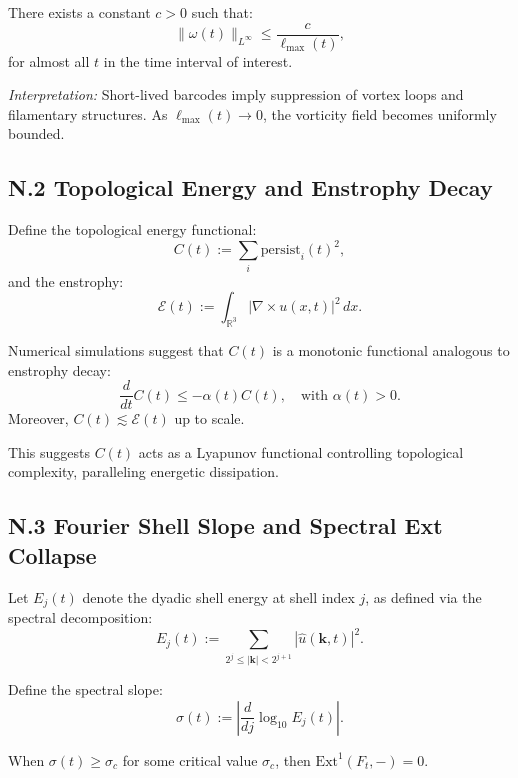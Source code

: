 \documentclass[11pt]{article}
\theoremstyle{definition}
\begin{document}
\begin{conjecture}
There exists a constant \( c > 0 \) such that:
\[
\|\omega(t)\|_{L^\infty} \leq \frac{c}{\ell_{\max}(t)},
\]
for almost all \( t \) in the time interval of interest.
\end{conjecture}

\textit{Interpretation:} Short-lived barcodes imply suppression of vortex loops and filamentary structures. As \( \ell_{\max}(t) \to 0 \), the vorticity field becomes uniformly bounded.

\subsection*{N.2 Topological Energy and Enstrophy Decay}

Define the topological energy functional:
\[
C(t) := \sum_i \mathrm{persist}_i(t)^2,
\]
and the enstrophy:
\[
\mathcal{E}(t) := \int_{\mathbb{R}^3} |\nabla \times u(x,t)|^2 \, dx.
\]

\begin{observation}
Numerical simulations suggest that \( C(t) \) is a monotonic functional analogous to enstrophy decay:
\[
\frac{d}{dt} C(t) \leq -\alpha(t) C(t), \quad \text{with } \alpha(t) > 0.
\]
Moreover, \( C(t) \lesssim \mathcal{E}(t) \) up to scale.
\end{observation}

This suggests \( C(t) \) acts as a Lyapunov functional controlling topological complexity, paralleling energetic dissipation.

\subsection*{N.3 Fourier Shell Slope and Spectral Ext Collapse}

Let \( E_j(t) \) denote the dyadic shell energy at shell index \( j \), as defined via the spectral decomposition:
\[
E_j(t) := \sum_{2^j \leq |\mathbf{k}| < 2^{j+1}} |\hat{u}(\mathbf{k},t)|^2.
\]

Define the spectral slope:
\[
\sigma(t) := \left| \frac{d}{dj} \log_{10} E_j(t) \right|.
\]

\begin{conjecture}
When \( \sigma(t) \geq \sigma_c \) for some critical value \( \sigma_c \), then \( \mathrm{Ext}^1(F_t, -) = 0 \).
\end{conjecture}
\end{document}
